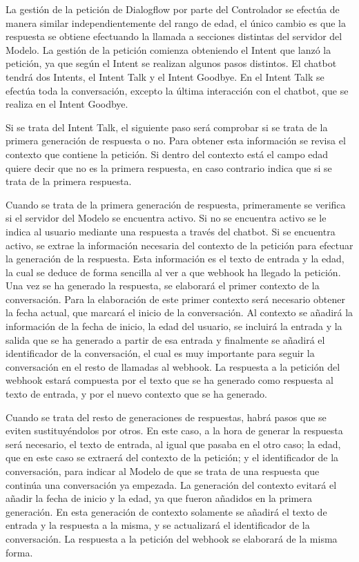 La gestión de la petición de Dialogflow por parte del Controlador se efectúa de manera similar independientemente del rango de edad, el único cambio es que la respuesta se obtiene efectuando la llamada a secciones distintas del servidor del Modelo. La gestión de la petición comienza obteniendo el Intent que lanzó la petición, ya que según el Intent se realizan algunos pasos distintos. El chatbot tendrá dos Intents, el Intent Talk y el Intent Goodbye. En el Intent Talk se efectúa toda la conversación, excepto la última interacción con el chatbot, que se realiza en el Intent Goodbye.

Si se trata del Intent Talk, el siguiente paso será comprobar si se trata de la primera generación de respuesta o no. Para obtener esta información se revisa el contexto que contiene la petición. Si dentro del contexto está el campo edad quiere decir que no es la primera respuesta, en caso contrario indica que si se trata de la primera respuesta.

Cuando se trata de la primera generación de respuesta, primeramente se verifica si el servidor del Modelo se encuentra activo. Si no se encuentra activo se le indica al usuario mediante una respuesta a través del chatbot. Si se encuentra activo, se extrae la información necesaria del contexto de la petición para efectuar la generación de la respuesta. Esta información es el texto de entrada y la edad, la cual se deduce de forma sencilla al ver a que webhook ha llegado la petición. Una vez se ha generado la respuesta, se elaborará el primer contexto de la conversación. Para la elaboración de este primer contexto será necesario obtener la fecha actual, que marcará el inicio de la conversación. Al contexto se añadirá la información de la fecha de inicio, la edad del usuario, se incluirá la entrada y la salida que se ha generado a partir de esa entrada y finalmente se añadirá el identificador de la conversación, el cual es muy importante para seguir la conversación en el resto de llamadas al webhook. La respuesta a la petición del webhook estará compuesta por el texto que se ha generado como respuesta al texto de entrada, y por el nuevo contexto que se ha generado.

Cuando se trata del resto de generaciones de respuestas, habrá pasos que se eviten sustituyéndolos por otros. En este caso, a la hora de generar la respuesta será necesario, el texto de entrada, al igual que pasaba en el otro caso; la edad, que en este caso se extraerá del contexto de la petición; y el identificador de la conversación, para indicar al Modelo de que se trata de una respuesta que continúa una conversación ya empezada. La generación del contexto evitará el añadir la fecha de inicio y la edad, ya que fueron añadidos en la primera generación. En esta generación de contexto solamente se añadirá el texto de entrada y la respuesta a la misma, y se actualizará el identificador de la conversación. La respuesta a la petición del webhook se elaborará de la misma forma.

